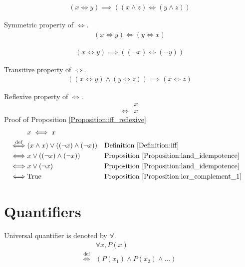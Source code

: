 \begin{prop}
\label{Proposition:iff_land}
\begin{align*}
(x \iff y) \implies ((x \land z) \iff (y \land z))
\end{align*}
\end{prop}

\begin{prop}
\label{Proposition:iff_symmetric}
Symmetric property of $\iff$.
\begin{align*}
(x \iff y) \iff (y \iff x)
\end{align*}
\end{prop}

\begin{prop}
\label{Proposition:iff_lnot}
\begin{align*}
(x \iff y) \implies ((\lnot x) \iff (\lnot y))
\end{align*}
\end{prop}

\begin{prop}
\label{Proposition:iff_transitive}
Transitive property of $\iff$.
\begin{align*}
((x \iff y) \land (y \iff z)) \implies (x \iff z)
\end{align*}
\end{prop}

\begin{prop}
\label{Proposition:iff_reflexive}
Reflexive property of $\iff$.
\begin{align*}
& x \\
\iff & x
\end{align*}
Proof of Proposition \ref{Proposition:iff_reflexive}
\begin{align*}
& x \iff x \\
\overset{\operatorname{def}}{\iff} & (x \land x) \lor ((\lnot x) \land (\lnot x))
&& \text{Definition \ref{Definition:iff}} \\
\iff & x \lor ((\lnot x) \land (\lnot x))
&& \text{Proposition \ref{Proposition:land_idempotence}} \\
\iff & x \lor (\lnot x)
&& \text{Proposition \ref{Proposition:land_idempotence}} \\
\iff & \text{True}
&& \text{Proposition \ref{Proposition:lor_complement_1}} \\
\end{align*}
\end{prop}

\section{Quantifiers}
\begin{defn}
Universal quantifier is denoted by $\forall$.
\begin{align*}
& \forall x, P(x) \\
\overset{\operatorname{def}}{\iff} & (P(x_1) \land P(x_2) \land \dots)
\end{align*}
\end{defn}

